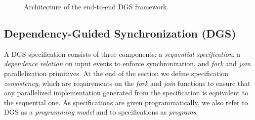 \begin{figure}
  \centering
  \caption{Architecture of the end-to-end DGS framework.
  }
\label{fig:system-architecture-overview}
\end{figure}

\subsection{Dependency-Guided Synchronization (DGS)}
\label{sec:prog-model}

A DGS specification consists of three components: a
\emph{sequential specification}, a \emph{dependence relation} on input
events to enforce synchronization, and \emph{fork} and \emph{join}
parallelization primitives.
At the end of the section we define specification \emph{consistency}, which are requirements on the \emph{fork} and \emph{join} functions to ensure that any parallelized implementation generated from the specification is equivalent to the sequential one.
As specifications are given programmatically,
we also refer to DGS as a \emph{programming model} and
to specifications as \emph{programs}.

